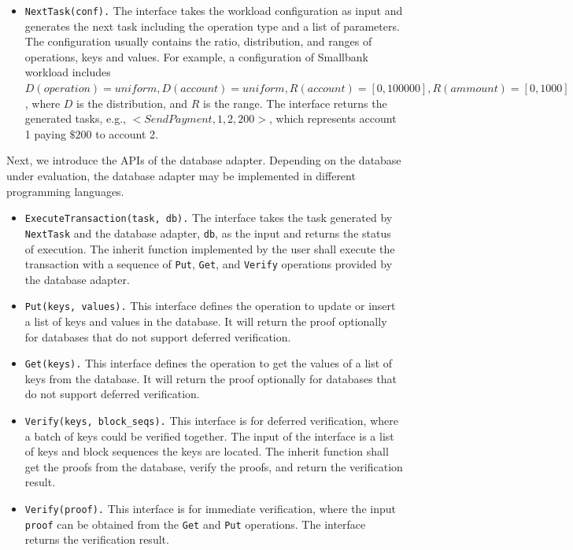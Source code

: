 \documentclass[11pt,dvipdfm]{article}
\begin{document}
\begin{itemize}
    \item \texttt{NextTask(conf).} The interface takes the workload configuration as input and generates the next task including the operation type and a list of parameters. The configuration usually contains the ratio, distribution, and ranges of operations, keys and values. For example, a configuration of Smallbank workload includes $D(operation) = uniform, D(account) = uniform, R(account) = [0, 100000], R(ammount) = [0,1000]$, where $D$ is the distribution, and $R$ is the range. The interface returns the generated tasks, e.g., $<SendPayment, 1, 2, 200>$, which represents account 1 paying $\$200$ to account 2.
\end{itemize}

Next, we introduce the APIs of the database adapter. Depending on the database under evaluation, the database adapter may be implemented in different programming languages.

\begin{itemize}
    \item \texttt{ExecuteTransaction(task, db).} The interface takes the task generated by \texttt{NextTask} and the database adapter, \texttt{db}, as the input and returns the status of execution. The inherit function implemented by the user shall execute the transaction with a sequence of \texttt{Put}, \texttt{Get}, and \texttt{Verify} operations provided by the database adapter.
    \item \texttt{Put(keys, values).} This interface defines the operation to update or insert a list of keys and values in the database. It will return the proof optionally for databases that do not support deferred verification.
    \item \texttt{Get(keys).} This interface defines the operation to get the values of a list of keys from the database. It will return the proof optionally for databases that do not support deferred verification.
    \item \texttt{Verify(keys, block\_seqs).} This interface is for deferred verification, where a batch of keys could be verified together. The input of the interface is a list of keys and block sequences the keys are located. The inherit function shall get the proofs from the database, verify the proofs, and return the verification result.
    \item \texttt{Verify(proof).} This interface is for immediate verification, where the input \texttt{proof} can be obtained from the \texttt{Get} and \texttt{Put} operations. The interface returns the verification result.
\end{itemize}
\end{document}
